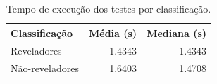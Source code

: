 \begin{table}[ht]
\centering
\caption{Tempo de execução dos testes por classificação.}
\label{tab:execution-time-classification}
\begin{tabular}{lrr}
\hline
Classificação & Média (s) & Mediana (s) \\
\hline
Reveladores & 1.4343 & 1.4343 \\
Não-reveladores & 1.6403 & 1.4708 \\
\hline
\end{tabular}
\end{table}
